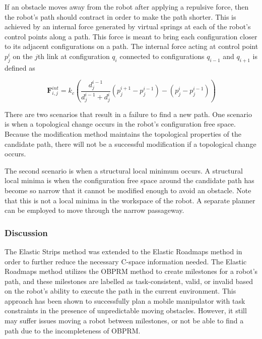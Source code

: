 \documentclass[10pt,conference]{ieeeconf}
\begin{document}
If an obstacle moves away from the robot after applying a repulsive force, then the robot's path should contract in order to make the path shorter. This is achieved by an internal force generated by virtual springs at each of the robot's control points along a path. This force is meant to bring each configuration closer to its adjacent configurations on a path. The internal force acting at control point $p^i_j$ on the $j$th link at configuration $q_i$ connected to configurations $q_{i-1}$ and $q_{i+1}$ is defined as

\begin{equation}
\textbf{F}^{int}_{i,j} = k_c\left( \frac{d^{i-1}_j}{d^{i-1}_j+d^i_j} (p^{i+1}_j-p^{i-1}_j)-(p^i_j-p^{i-1}_j) \right)
\end{equation}




There are two scenarios that result in a failure to find a new path. One scenario is when a topological change occurs in the robot's configuration free space. Because the modification method maintains the topological properties of the candidate path, there will not be a successful modification if a topological change occurs.

The second scenario is when a structural local minimum occurs. A structural local minima is when the configuration free space around the candidate path has become so narrow that it cannot be modified enough to avoid an obstacle. Note that this is not a local minima in the workspace of the robot. A separate planner can be employed to move through the narrow passageway.

\subsubsection{Discussion}

The Elastic Strips method was extended to the Elastic Roadmaps method \cite{yang2009elastic} in order to further reduce the necessary C-space information needed. The Elastic Roadmaps method utilizes the OBPRM method to create milestones for a robot's path, and these milestones are labelled as task-consistent, valid, or invalid based on the robot's ability to execute the path in the current environment. This approach has been shown to successfully plan a mobile manipulator with task constraints in the presence of unpredictable moving obstacles. However, it still may suffer issues moving a robot between milestones, or not be able to find a path due to the incompleteness of OBPRM.
\end{document}
